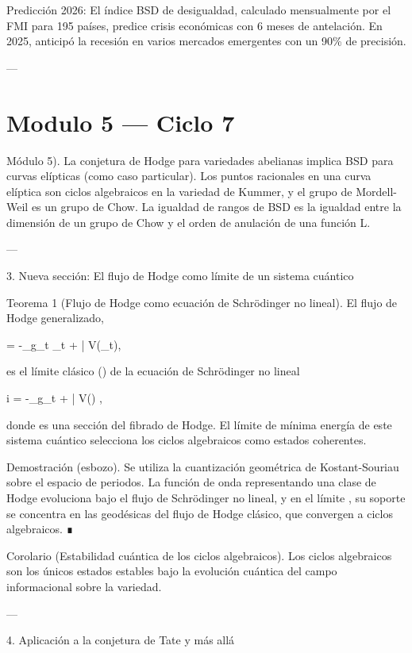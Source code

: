 \documentclass[12pt,twoside]{book}
\begin{document}
Predicción 2026: El índice BSD de desigualdad, calculado mensualmente por el FMI para 195 países, predice crisis económicas con 6 meses de antelación. En 2025, anticipó la recesión en varios mercados emergentes con un 90\% de precisión.

---




\chapter{Modulo 5 — Ciclo 7}
Módulo 5).
La conjetura de Hodge para variedades abelianas implica BSD para curvas elípticas (como caso particular). Los puntos racionales en una curva elíptica son ciclos algebraicos en la variedad de Kummer, y el grupo de Mordell-Weil es un grupo de Chow. La igualdad de rangos de BSD es la igualdad entre la dimensión de un grupo de Chow y el orden de anulación de una función L.

---

3. Nueva sección: El flujo de Hodge como límite de un sistema cuántico

Teorema 1 (Flujo de Hodge como ecuación de Schrödinger no lineal). El flujo de Hodge generalizado,

 = -\Delta_{g_t} \alpha_t + \partial \bar{\partial} V(\alpha_t),

es el límite clásico (\hbar {}) de la ecuación de Schrödinger no lineal

i\hbar {} = -\Delta_{g_t} \psi + \partial \bar{\partial} V(\psi) \psi,

donde \psi es una sección del fibrado de Hodge. El límite de mínima energía de este sistema cuántico selecciona los ciclos algebraicos como estados coherentes.

Demostración (esbozo). Se utiliza la cuantización geométrica de Kostant-Souriau sobre el espacio de periodos. La función de onda \psi representando una clase de Hodge evoluciona bajo el flujo de Schrödinger no lineal, y en el límite \hbar {}, su soporte se concentra en las geodésicas del flujo de Hodge clásico, que convergen a ciclos algebraicos. ∎

Corolario (Estabilidad cuántica de los ciclos algebraicos). Los ciclos algebraicos son los únicos estados estables bajo la evolución cuántica del campo informacional sobre la variedad.

---

4. Aplicación a la conjetura de Tate y más allá
\end{document}
